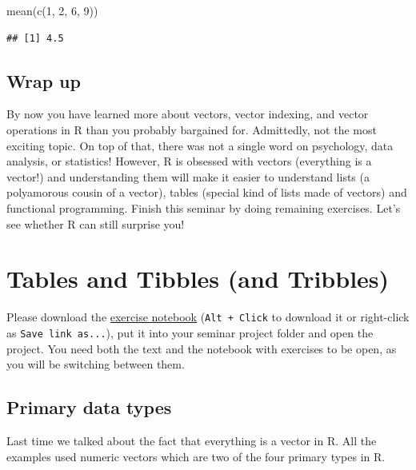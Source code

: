 \documentclass[
]{book}
\newenvironment{Shaded}{\begin{snugshade}}{\end{snugshade}}
\newcommand{\DecValTok}[1]{\textcolor[rgb]{0.00,0.00,0.81}{#1}}
\newcommand{\FunctionTok}[1]{\textcolor[rgb]{0.00,0.00,0.00}{#1}}
\newcommand{\NormalTok}[1]{#1}
\begin{document}
\begin{Shaded}
\begin{Highlighting}[]
\FunctionTok{mean}\NormalTok{(}\FunctionTok{c}\NormalTok{(}\DecValTok{1}\NormalTok{, }\DecValTok{2}\NormalTok{, }\DecValTok{6}\NormalTok{, }\DecValTok{9}\NormalTok{))}
\end{Highlighting}
\end{Shaded}

\begin{verbatim}
## [1] 4.5
\end{verbatim}

\hypertarget{wrap-up}{%
\section{Wrap up}\label{wrap-up}}

By now you have learned more about vectors, vector indexing, and vector operations in R than you probably bargained for. Admittedly, not the most exciting topic. On top of that, there was not a single word on psychology, data analysis, or statistics! However, R is obsessed with vectors (everything is a vector!) and understanding them will make it easier to understand lists (a polyamorous cousin of a vector), tables (special kind of lists made of vectors) and functional programming. Finish this seminar by doing remaining exercises. Let's see whether R can still surprise you!

\hypertarget{tables}{%
\chapter{Tables and Tibbles (and Tribbles)}\label{tables}}

Please download the \href{notebooks/Seminar\%2003\%20-\%20Tables.Rmd}{exercise notebook} (\texttt{Alt\ +\ Click} to download it or right-click as \texttt{Save\ link\ as...}), put it into your seminar project folder and open the project. You need both the text and the notebook with exercises to be open, as you will be switching between them.

\hypertarget{primarytypes}{%
\section{Primary data types}\label{primarytypes}}

Last time we talked about the fact that everything is a vector in R. All the examples used numeric vectors which are two of the four primary types in R.
\end{document}
